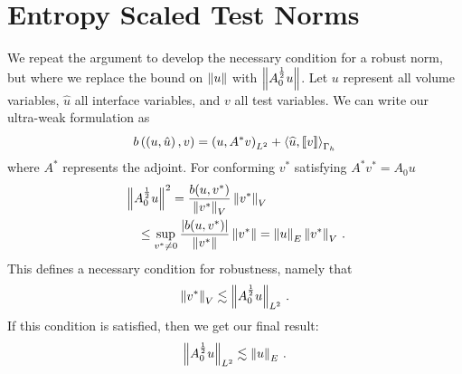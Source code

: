 \documentclass[Dissertation.tex]{subfiles}
\begin{document}
\section{Entropy Scaled Test Norms}
We repeat the argument to develop the necessary condition for a robust norm, but where we replace the bound
on $\left\| u \right\|$ with $\left\| A_0^\frac{1}{2}u \right\|$.
Let $u$ represent all volume variables, $\hat u$ all interface variables, and $v$ all test variables.
We can write our ultra-weak formulation as
\[
b\left( \left( u,\hat u \right),v \right) = \left( u,A^* v \right)_{L^2} + \left\langle \widehat{u}, \left[ \![v]\! \right] \right\rangle_{\Gamma_h}
\]
where $A^*$ represents the adjoint.
For conforming $v^*$ satisfying $A^* v^* = A_0u$
\begin{align*}
&\left\| A_0^\frac{1}{2}u \right\|^2
=\frac{b(u,v^*)}{\left\| v^* \right\|_V} \left\| v^* \right\|_V\\
&\quad\leq\sup_{v^*\neq0}\frac{|b(u,v^*)|}{\left\| v^* \right\|}\left\| v^* \right\|
=\left\| u \right\|_E \left\| v^* \right\|_V\,.
\end{align*}
This defines a necessary condition for robustness, namely that
\begin{align}
\label{eq:entropyNecessaryCondition}
\left\| v^* \right\|_V\lesssim\left\| A_0^\frac{1}{2}u \right\|_{L^2}\,.
\end{align}
If this condition is satisfied, then we get our final result:
\begin{align*}
\left\| A_0^\frac{1}{2}u \right\|_{L^2}\lesssim\left\| u \right\|_E\,.
\end{align*}
\end{document}
